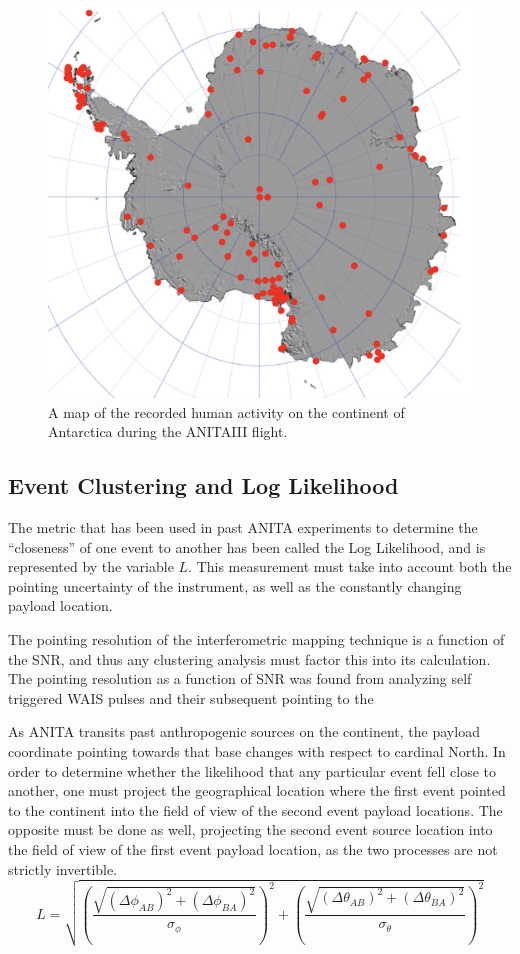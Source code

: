 \begin{figure}
	\includegraphics[width=\textwidth]{figures/BaseMap}
	\caption{A map of the recorded human activity on the continent of Antarctica during the ANITAIII flight.}
	\label{fig:BaseMap}
\end{figure}	
	
	
	\subsection{Event Clustering and Log Likelihood}
		The metric that has been used in past ANITA experiments to determine the ``closeness'' of one event to another has been called the Log Likelihood, and is represented by the variable $L$.  This measurement must take into account both the pointing uncertainty of the instrument, as well as the constantly changing payload location.
		
		The pointing resolution of the interferometric mapping technique is a function of the SNR, and thus any clustering analysis must factor this into its calculation.  The pointing resolution as a function of SNR was found from analyzing self triggered WAIS pulses and their subsequent pointing to the 
		
		As ANITA transits past anthropogenic sources on the continent, the payload coordinate pointing towards that base changes with respect to cardinal North. In order to determine whether the likelihood that any particular event fell close to another, one must project the geographical location where the first event pointed to the continent into the field of view of the second event payload locations.  The opposite must be done as well, projecting the second event source location into the field of view of the first event payload location, as the two processes are not strictly invertible.
	\begin{equation}
		L = \sqrt{(\frac{\sqrt{(\Delta\phi_{AB})^2+(\Delta\phi_{BA})^2}}{{\sigma_{\phi}}})^2+(\frac{\sqrt{(\Delta\theta_{AB})^2+(\Delta\theta_{BA})^2}}{{\sigma_{\theta}}})^2}
	\end{equation}
	
